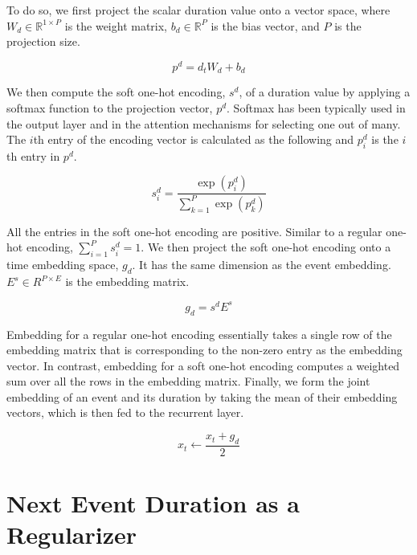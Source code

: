 \documentclass{article} %
\begin{document}
To do so, we first project the scalar duration value onto a vector space, where $W_d\in{\mathbb{R}^{1\times{P}}}$ is the weight matrix, $b_d\in{\mathbb{R}^{P}}$ is the bias vector, and $P$ is the projection size.

\begin{equation}
\label{projection}
    p^d=d_tW_d+b_d
\end{equation}

We then compute the soft one-hot encoding, $s^d$, of a duration value by applying a softmax function to the projection vector, $p^d$. Softmax has been typically used in the output layer \citep{graves2012supervised} and in the attention mechanisms \citep{DBLP:journals/corr/BahdanauCB14, DBLP:journals/corr/XuBKCCSZB15} for selecting one out of many. The $i$th entry of the encoding vector is calculated as the following and $p^d_i$ is the $i$th entry in $p^d$.

\begin{equation}
\label{softmax}
    s_i^d=\dfrac{\exp(p^d_i)}{\sum_{k=1}^{P}\exp(p^d_k)}
\end{equation}

All the entries in the soft one-hot encoding are positive. Similar to a regular one-hot encoding, $\sum_{i=1}^{P}s_i^d=1$. We then project the soft one-hot encoding onto a time embedding space, $g_d$. It has the same dimension as the event embedding. $E^s\in{R^{P\times{E}}}$ is the embedding matrix.

\begin{equation}
    g_d=s^dE^s
\end{equation}

Embedding for a regular one-hot encoding essentially takes a single row of the embedding matrix that is corresponding to the non-zero entry as the embedding vector. In contrast, embedding for a soft one-hot encoding computes a weighted sum over all the rows in the embedding matrix. Finally, we form the joint embedding of an event and its duration by taking the mean of their embedding vectors, which is then fed to the recurrent layer.

\begin{equation}
    x_t\leftarrow\dfrac{{x_t+g_d}}{2}
\end{equation}

\section{Next Event Duration as a Regularizer}
\end{document}
